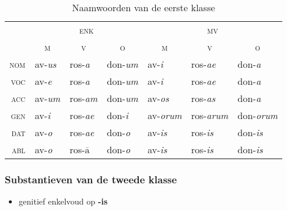 \documentclass[12pt,a4paper]{article}
\begin{document}
\begin{table}[H]
\centering
\begin{tabular}{ r | l l l | l l l }
\toprule
 & \multicolumn{3}{c|}{\textsc{enk}} & \multicolumn{3}{c}{\textsc{mv}} \\
 & \multicolumn{1}{c}{\textsc{m}} & \multicolumn{1}{c}{\textsc{v}} & \multicolumn{1}{c|}{\textsc{o}} & \multicolumn{1}{c}{\textsc{m}} & \multicolumn{1}{c}{\textsc{v}} & \multicolumn{1}{c}{\textsc{o}} \\ 
\midrule
\textsc{nom} & av-\emph{us} & ros-\emph{a}  & don-\emph{um} & av-\emph{i}    & ros-\emph{ae}   & don-\emph{a} \\
\textsc{voc} & av-\emph{e}  & ros-\emph{a}  & don-\emph{um} & av-\emph{i}    & ros-\emph{ae}   & don-\emph{a} \\
\textsc{acc} & av-\emph{um} & ros-\emph{am} & don-\emph{um} & av-\emph{os}   & ros-\emph{as}   & don-\emph{a} \\
\textsc{gen} & av-\emph{i}  & ros-\emph{ae} & don-\emph{i}  & av-\emph{orum} & ros-\emph{arum} & don-\emph{orum} \\
\textsc{dat} & av-\emph{o}  & ros-\emph{ae} & don-\emph{o}  & av-\emph{is}   & ros-\emph{is}   & don-\emph{is} \\
\textsc{abl} & av-\emph{o}  & ros-\emph{$\overline{\text{a}}$} & don-\emph{o} & av-\emph{is} & ros-\emph{is} & don-\emph{is} \\
\bottomrule
\end{tabular}
\caption{Naamwoorden van de eerste klasse}
\label{tab:nw1}
\end{table}

\subsubsection{Substantieven van de tweede klasse}
\begin{itemize}
    \item genitief enkelvoud op \textbf{-is}
\end{itemize}
\end{document}
